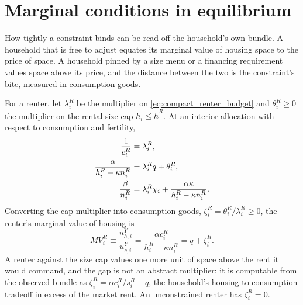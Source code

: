 \documentclass[11pt]{article}
\newcommand{\1}{\mathbf 1}
\begin{document}
\section{Marginal conditions in equilibrium}

How tightly a constraint binds can be read off the household's own bundle. A household that is free to adjust equates its marginal value of housing space to the price of space. A household pinned by a size menu or a financing requirement values space above its price, and the distance between the two is the constraint's bite, measured in consumption goods.

For a renter, let $\lambda_i^R$ be the multiplier on \eqref{eq:compact_renter_budget} and $\theta_i^R\ge0$ the multiplier on the rental size cap $h_i\le\bar h^R$. At an interior allocation with respect to consumption and fertility,
\begin{align}
\frac{1}{c_i^R}&=\lambda_i^R,
\notag\\
\frac{\alpha}{h_i^R-\kappa n_i^R}&=\lambda_i^R q+\theta_i^R,
\notag\\
\frac{\beta}{n_i^R}&=\lambda_i^R\chi_i+\frac{\alpha\kappa}{h_i^R-\kappa n_i^R}.
\label{eq:compact_renter_foc_n}
\end{align}
Converting the cap multiplier into consumption goods, $\zeta_i^R=\theta_i^R/\lambda_i^R\ge0$, the renter's marginal value of housing is
\begin{equation}
MV_i^R
\equiv
\frac{u^Y_{h,i}}{u^Y_{c,i}}
=
\frac{\alpha c_i^R}{h_i^R-\kappa n_i^R}
=
q+\zeta_i^R.
\label{eq:compact_renter_mv}
\end{equation}
A renter against the size cap values one more unit of space above the rent it would command, and the gap is not an abstract multiplier: it is computable from the observed bundle as $\zeta_i^R=\alpha c_i^R/s_i^R-q$, the household's housing-to-consumption tradeoff in excess of the market rent. An unconstrained renter has $\zeta_i^R=0$.
\end{document}
